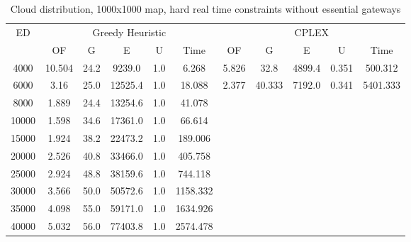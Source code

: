 \begin{table}[htb]
	\centering
	\begin{tabular}{|c|c|c|c|c|c|c|c|c|c|c|}
		\hline
		\multirow{2}{*}{ED} & \multicolumn{5}{c|}{Greedy Heuristic} & \multicolumn{5}{c|}{CPLEX}\\ 
		\cline{2-11}
& OF & G & E & U & Time & OF & G & E & U & Time\\ 
		\hline
		4000 & 10.504 & 24.2 & 9239.0 & 1.0 & 6.268 & 5.826 & 32.8 & 4899.4 & 0.351 & 500.312 \\ 
		6000 & 3.16 & 25.0 & 12525.4 & 1.0 & 18.088 & 2.377 & 40.333 & 7192.0 & 0.341 & 5401.333 \\ 
		8000 & 1.889 & 24.4 & 13254.6 & 1.0 & 41.078 & & & & &  \\ 
		10000 & 1.598 & 34.6 & 17361.0 & 1.0 & 66.614 & & & & &  \\ 
		15000 & 1.924 & 38.2 & 22473.2 & 1.0 & 189.006 & & & & &  \\ 
		20000 & 2.526 & 40.8 & 33466.0 & 1.0 & 405.758 & & & & &  \\ 
		25000 & 2.924 & 48.8 & 38159.6 & 1.0 & 744.118 & & & & &  \\ 
		30000 & 3.566 & 50.0 & 50572.6 & 1.0 & 1158.332 & & & & &  \\ 
		35000 & 4.098 & 55.0 & 59171.0 & 1.0 & 1634.926 & & & & &  \\ 
		40000 & 5.032 & 56.0 & 77403.8 & 1.0 & 2574.478 & & & & &  \\ 
		\hline 
	\end{tabular} 
	\caption{Cloud distribution, 1000x1000 map, hard real time constraints without essential gateways} 
	\label{tab:cloud_hard_n_esc_1000} 
\end{table} 

